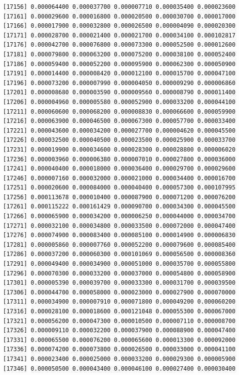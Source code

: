 \documentclass[]{article}
\begin{document}
\begin{verbatim}
[17156] 0.000064400 0.000037700 0.000007710 0.000035400 0.000023600
[17161] 0.000029600 0.000016800 0.000020500 0.000030700 0.000017000
[17166] 0.000017900 0.000032800 0.000026500 0.000004090 0.000020300
[17171] 0.000028700 0.000021400 0.000021700 0.000034100 0.000102817
[17176] 0.000042700 0.000076800 0.000073300 0.000052500 0.000012600
[17181] 0.000079800 0.000063200 0.000075200 0.000038100 0.000052400
[17186] 0.000059400 0.000052200 0.000095900 0.000062300 0.000050900
[17191] 0.000014400 0.000008420 0.000012100 0.000015700 0.000047100
[17196] 0.000073200 0.000007990 0.000004050 0.000009290 0.000006860
[17201] 0.000008680 0.000003590 0.000009560 0.000008790 0.000011400
[17206] 0.000004960 0.000005580 0.000052900 0.000033200 0.000044100
[17211] 0.000060600 0.000068200 0.000008830 0.000066600 0.000059900
[17216] 0.000063900 0.000046500 0.000067300 0.000057700 0.000033400
[17221] 0.000043600 0.000034200 0.000027700 0.000004620 0.000045500
[17226] 0.000032500 0.000040500 0.000023500 0.000025900 0.000033700
[17231] 0.000019900 0.000034600 0.000028300 0.000028800 0.000006020
[17236] 0.000003960 0.000006380 0.000007010 0.000027800 0.000036000
[17241] 0.000040400 0.000018000 0.000036400 0.000029700 0.000029600
[17246] 0.000007160 0.000032000 0.000021000 0.000034400 0.000016700
[17251] 0.000020600 0.000084000 0.000040400 0.000057300 0.000107995
[17256] 0.000113678 0.000010400 0.000087900 0.000071200 0.000076200
[17261] 0.000115222 0.000161429 0.000090700 0.000034300 0.000045500
[17266] 0.000065900 0.000034200 0.000006250 0.000044000 0.000034700
[17271] 0.000032100 0.000034800 0.000033500 0.000072000 0.000047400
[17276] 0.000074900 0.000083400 0.000085100 0.000014900 0.000006830
[17281] 0.000005860 0.000007760 0.000052200 0.000079600 0.000085400
[17286] 0.000037200 0.000060300 0.000101069 0.000056500 0.000008360
[17291] 0.000049400 0.000034900 0.000051000 0.000035700 0.000055800
[17296] 0.000070300 0.000033200 0.000037000 0.000054800 0.000058900
[17301] 0.000005390 0.000039700 0.000033300 0.000031700 0.000039500
[17306] 0.000044700 0.000058000 0.000023000 0.000027900 0.000070000
[17311] 0.000034900 0.000007910 0.000071800 0.000049200 0.000060200
[17316] 0.000028100 0.000018600 0.000121048 0.000055300 0.000067000
[17321] 0.000056200 0.000047300 0.000010500 0.000007110 0.000008700
[17326] 0.000009110 0.000032200 0.000037900 0.000088900 0.000047400
[17331] 0.000065500 0.000076200 0.000065600 0.000013300 0.000092000
[17336] 0.000074200 0.000073800 0.000026500 0.000033000 0.000041100
[17341] 0.000023400 0.000025000 0.000033200 0.000029300 0.000005900
[17346] 0.000050500 0.000043400 0.000046100 0.000027400 0.000030400

\end{verbatim}
\end{document}
